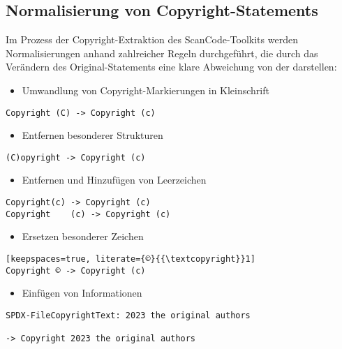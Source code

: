 
\subsection{Normalisierung von Copyright-Statements}

Im Prozess der Copyright-Extraktion des ScanCode-Toolkits werden Normalisierungen anhand zahlreicher Regeln durchgeführt, die durch das Verändern des Original-Statements eine klare Abweichung von der  darstellen:

\begin{itemize}
    \item Umwandlung von Copyright-Markierungen in Kleinschrift
\end{itemize}
\begin{lstlisting}[keepspaces=true]
Copyright (C) -> Copyright (c)
\end{lstlisting}

\begin{itemize}
    \item Entfernen besonderer Strukturen
\end{itemize}
\begin{lstlisting}[keepspaces=true]
(C)opyright -> Copyright (c)
\end{lstlisting}

\begin{itemize}
    \item Entfernen und Hinzufügen von Leerzeichen
\end{itemize}
\begin{lstlisting}[keepspaces=true]
Copyright(c) -> Copyright (c)
Copyright    (c) -> Copyright (c)
\end{lstlisting}

\begin{itemize}
    \item Ersetzen besonderer Zeichen
\end{itemize}
\begin{lstlisting}[keepspaces=true, literate={©}{{\textcopyright}}1]
Copyright © -> Copyright (c)
\end{lstlisting}

\begin{itemize}
    \item Einfügen von Informationen
\end{itemize}
\begin{lstlisting}[keepspaces=true]
SPDX-FileCopyrightText: 2023 the original authors

-> Copyright 2023 the original authors
\end{lstlisting}


